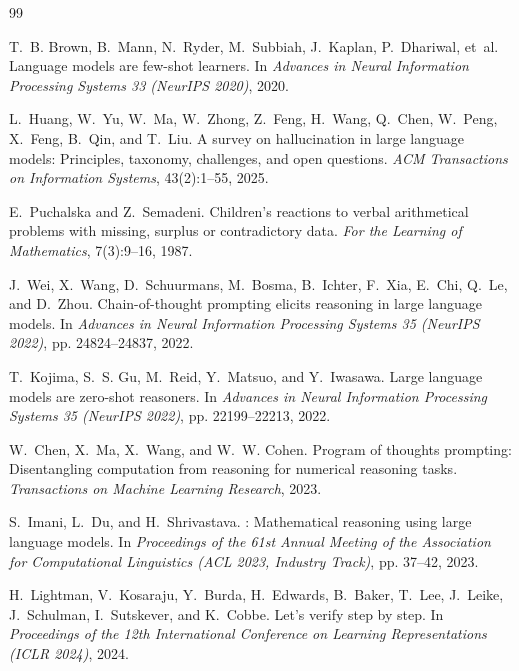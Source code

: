 \documentclass[sigconf, nonacm, onecolumn]{acmart}
\begin{document}

\begin{thebibliography}{99}

T.~B. Brown, B.~Mann, N.~Ryder, M.~Subbiah, J.~Kaplan, P.~Dhariwal, et~al.
\newblock Language models are few-shot learners.
\newblock In \emph{Advances in Neural Information Processing Systems 33
  (NeurIPS 2020)}, 2020.

L.~Huang, W.~Yu, W.~Ma, W.~Zhong, Z.~Feng, H.~Wang, Q.~Chen, W.~Peng,
  X.~Feng, B.~Qin, and T.~Liu.
\newblock A survey on hallucination in large language models: Principles,
  taxonomy, challenges, and open questions.
\newblock \emph{ACM Transactions on Information Systems}, 43(2):1--55, 2025.

E.~Puchalska and Z.~Semadeni.
\newblock Children's reactions to verbal arithmetical problems with
  missing, surplus or contradictory data.
\newblock \emph{For the Learning of Mathematics}, 7(3):9--16, 1987.

J.~Wei, X.~Wang, D.~Schuurmans, M.~Bosma, B.~Ichter, F.~Xia, E.~Chi,
  Q.~Le, and D.~Zhou.
\newblock Chain-of-thought prompting elicits reasoning in large language
  models.
\newblock In \emph{Advances in Neural Information Processing Systems 35
  (NeurIPS 2022)}, pp. 24824--24837, 2022.

T.~Kojima, S.~S. Gu, M.~Reid, Y.~Matsuo, and Y.~Iwasawa.
\newblock Large language models are zero-shot reasoners.
\newblock In \emph{Advances in Neural Information Processing Systems 35
  (NeurIPS 2022)}, pp. 22199--22213, 2022.

W.~Chen, X.~Ma, X.~Wang, and W.~W. Cohen.
\newblock Program of thoughts prompting: Disentangling computation from
  reasoning for numerical reasoning tasks.
\newblock \emph{Transactions on Machine Learning Research}, 2023.

S.~Imani, L.~Du, and H.~Shrivastava.
: Mathematical reasoning using large language
  models.
\newblock In \emph{Proceedings of the 61st Annual Meeting of the
  Association for Computational Linguistics (ACL 2023, Industry Track)},
  pp. 37--42, 2023.

H.~Lightman, V.~Kosaraju, Y.~Burda, H.~Edwards, B.~Baker, T.~Lee,
  J.~Leike, J.~Schulman, I.~Sutskever, and K.~Cobbe.
\newblock Let's verify step by step.
\newblock In \emph{Proceedings of the 12th International Conference on
  Learning Representations (ICLR 2024)}, 2024.


\end{thebibliography}
\end{document}
